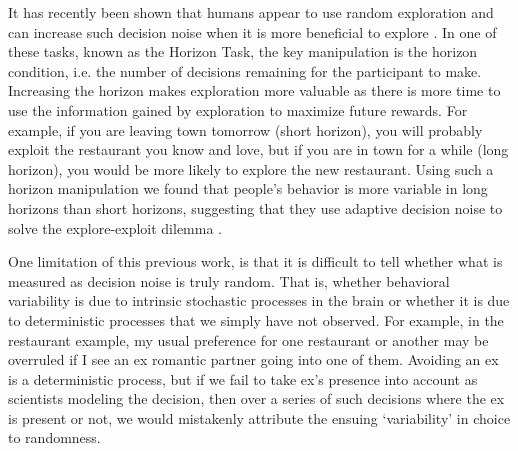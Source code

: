 \documentclass[12pt]{article}
\begin{document}
	It has recently been shown that humans appear to use random exploration and can increase such decision noise when it is more beneficial to explore \citep{Gershman2018, wilson2014}. In one of these tasks, known as the Horizon Task, the key manipulation is the horizon condition, i.e. the number of decisions remaining for the participant to make. Increasing the horizon makes exploration more valuable as there is more time to use the information gained by exploration to maximize future rewards. For example, if you are leaving town tomorrow (short horizon), you will probably exploit the restaurant you know and love, but if you are in town for a while (long horizon), you would be more likely to explore the new restaurant. Using such a horizon manipulation we found that people's behavior is more variable in long horizons than short horizons, suggesting that they use adaptive decision noise to solve the explore-exploit dilemma \citep{wilson2014}. 
	
	One limitation of this previous work, is that it is difficult to tell whether what is measured as decision noise is truly random. That is, whether behavioral variability is due to intrinsic stochastic processes in the brain or whether it is due to deterministic processes that we simply have not observed.  For example, in the restaurant example, my usual preference for one restaurant or another may be overruled if I see an ex romantic partner going into one of them. Avoiding an ex is a deterministic process, but if we fail to take ex's presence into account as scientists modeling the decision, then over a series of such decisions where the ex is present or not, we would mistakenly attribute the ensuing `variability' in choice to randomness.
	
	
	
	
\end{document}
